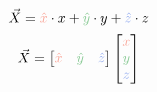 \documentclass[preview]{standalone}
\begin{document}
$$\vec{X} = \textcolor[HTML]{f9a598}{\hat{x}}\cdot x + \textcolor[HTML]{87c993}{\hat{y}}\cdot y + \textcolor[HTML]{94acef}{\hat{z}}\cdot z$$
$$\vec{X} = \begin{bmatrix}\textcolor[HTML]{f9a598}{\hat{x}}&\textcolor[HTML]{87c993}{\hat{y}}&\textcolor[HTML]{94acef}{\hat{z}}\end{bmatrix}\begin{bmatrix}\textcolor[HTML]{f9a598}{x}\\\textcolor[HTML]{87c993}{y}\\\textcolor[HTML]{94acef}{z}\end{bmatrix}$$
\end{document}
